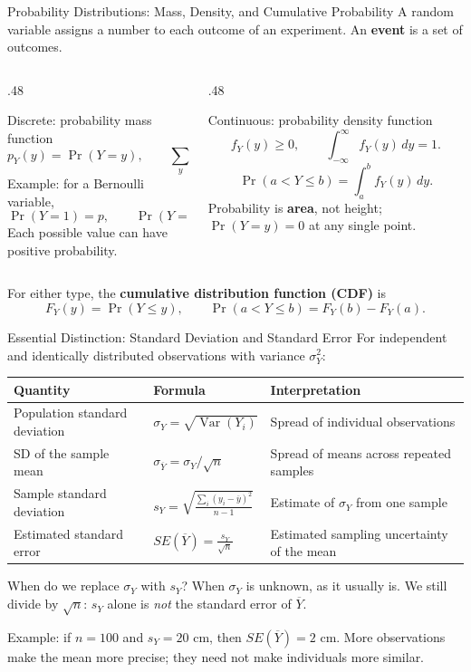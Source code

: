 \documentclass[10pt,aspectratio=169]{beamer}
\newcommand{\Var}{\operatorname{Var}}
\newcommand{\Prb}{\operatorname{Pr}}
\begin{document}
\begin{frame}{Probability Distributions: Mass, Density, and Cumulative Probability}
\small
A random variable assigns a number to each outcome of an experiment. An \textbf{event} is a set of outcomes.
\begin{columns}[T]
\begin{column}{.48\textwidth}
\begin{block}{Discrete: probability mass function}
\[
p_Y(y)=\Prb(Y=y),\qquad \sum_y p_Y(y)=1.
\]
Example: for a Bernoulli variable,
\[
\Prb(Y=1)=p,\qquad \Prb(Y=0)=1-p.
\]
Each possible value can have positive probability.
\end{block}
\end{column}
\begin{column}{.48\textwidth}
\begin{block}{Continuous: probability density function}
\[
f_Y(y)\geq0,\qquad \int_{-\infty}^{\infty}f_Y(y)\,dy=1.
\]
\[
\Prb(a<Y\leq b)=\int_a^b f_Y(y)\,dy.
\]
Probability is \textbf{area}, not height; $\Prb(Y=y)=0$ at any single point.
\end{block}
\end{column}
\end{columns}
\medskip
For either type, the \textbf{cumulative distribution function (CDF)} is
\[
F_Y(y)=\Prb(Y\leq y),\qquad
\Prb(a<Y\leq b)=F_Y(b)-F_Y(a).
\]
\end{frame}

\begin{frame}{Essential Distinction: Standard Deviation and Standard Error}
\small
For independent and identically distributed observations with variance $\sigma_Y^2$:
\begin{center}
\begin{tabular}{p{3.3cm}p{4.3cm}p{5.6cm}}
\toprule
Quantity & Formula & Interpretation\\
\midrule
Population standard deviation & $\sigma_Y=\sqrt{\Var(Y_i)}$ & Spread of individual observations\\[5pt]
SD of the sample mean & $\sigma_{\overline Y}=\sigma_Y/\sqrt n$ & Spread of means across repeated samples\\[5pt]
Sample standard deviation & $s_Y=\sqrt{\frac{\sum_i(y_i-\overline y)^2}{n-1}}$ & Estimate of $\sigma_Y$ from one sample\\[9pt]
Estimated standard error & $\displaystyle SE(\overline Y)=\frac{s_Y}{\sqrt n}$ & Estimated sampling uncertainty of the mean\\
\bottomrule
\end{tabular}
\end{center}
\begin{block}{When do we replace $\sigma_Y$ with $s_Y$?}
When $\sigma_Y$ is unknown, as it usually is. We still divide by $\sqrt n$:
$s_Y$ alone is \emph{not} the standard error of $\overline Y$.
\end{block}
Example: if $n=100$ and $s_Y=20$ cm, then $SE(\overline Y)=2$ cm.
More observations make the mean more precise; they need not make individuals more similar.
\end{frame}
\end{document}

